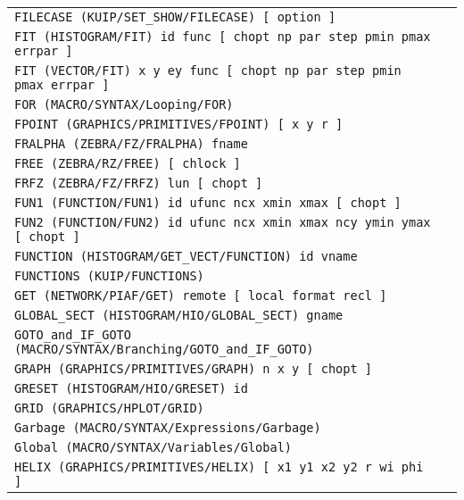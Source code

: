 \begin{longtable}{|>{\footnotesize\tt}lr|}
FILECASE (KUIP/SET_SHOW/FILECASE)  [ option ] & \pageref{ref:KUIP/SET_SHOW/FILECASE}\\ 
FIT (HISTOGRAM/FIT)  id func [ chopt np par step pmin pmax errpar ] & \pageref{ref:HISTOGRAM/FIT}\\ 
FIT (VECTOR/FIT)  x y ey func [ chopt np par step pmin pmax errpar ] & \pageref{ref:VECTOR/FIT}\\ 
FOR (MACRO/SYNTAX/Looping/FOR)  & \pageref{ref:MACRO/SYNTAX/Looping/FOR}\\ 
FPOINT (GRAPHICS/PRIMITIVES/FPOINT)  [ x y r ] & \pageref{ref:GRAPHICS/PRIMITIVES/FPOINT}\\ 
FRALPHA (ZEBRA/FZ/FRALPHA)  fname & \pageref{ref:ZEBRA/FZ/FRALPHA}\\ 
FREE (ZEBRA/RZ/FREE)  [ chlock ] & \pageref{ref:ZEBRA/RZ/FREE}\\ 
FRFZ (ZEBRA/FZ/FRFZ)  lun [ chopt ] & \pageref{ref:ZEBRA/FZ/FRFZ}\\ 
FUN1 (FUNCTION/FUN1)  id ufunc ncx xmin xmax [ chopt ] & \pageref{ref:FUNCTION/FUN1}\\ 
FUN2 (FUNCTION/FUN2)  id ufunc ncx xmin xmax ncy ymin ymax [ chopt ] & \pageref{ref:FUNCTION/FUN2}\\ 
FUNCTION (HISTOGRAM/GET_VECT/FUNCTION)  id vname & \pageref{ref:HISTOGRAM/GET_VECT/FUNCTION}\\ 
FUNCTIONS (KUIP/FUNCTIONS)  & \pageref{ref:KUIP/FUNCTIONS}\\ 
GET (NETWORK/PIAF/GET)  remote [ local format recl ] & \pageref{ref:NETWORK/PIAF/GET}\\ 
GLOBAL_SECT (HISTOGRAM/HIO/GLOBAL_SECT)  gname & \pageref{ref:HISTOGRAM/HIO/GLOBAL_SECT}\\ 
GOTO_and_IF_GOTO (MACRO/SYNTAX/Branching/GOTO_and_IF_GOTO)  & \pageref{ref:MACRO/SYNTAX/Branching/GOTO_and_IF_GOTO}\\ 
GRAPH (GRAPHICS/PRIMITIVES/GRAPH)  n x y [ chopt ] & \pageref{ref:GRAPHICS/PRIMITIVES/GRAPH}\\ 
GRESET (HISTOGRAM/HIO/GRESET)  id & \pageref{ref:HISTOGRAM/HIO/GRESET}\\ 
GRID (GRAPHICS/HPLOT/GRID)  & \pageref{ref:GRAPHICS/HPLOT/GRID}\\ 
Garbage (MACRO/SYNTAX/Expressions/Garbage)  & \pageref{ref:MACRO/SYNTAX/Expressions/Garbage}\\ 
Global (MACRO/SYNTAX/Variables/Global)  & \pageref{ref:MACRO/SYNTAX/Variables/Global}\\ 
HELIX (GRAPHICS/PRIMITIVES/HELIX)  [ x1 y1 x2 y2 r wi phi ] & \pageref{ref:GRAPHICS/PRIMITIVES/HELIX}\\ 

\end{longtable}
